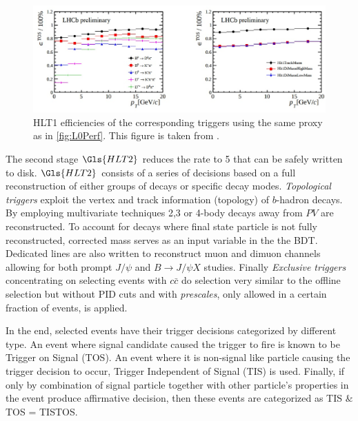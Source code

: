 \begin{figure}[!h]
	\centering
	\includegraphics[width = 1.0\textwidth]{figs/detector/HLT1performance.eps}%
	\caption{ \Gls{HLT1} efficiencies of the corresponding triggers using the same proxy as in \autoref{fig:L0Perf}.  This figure is taken from \cite{Albrecht:2013fba}. }  
	\label{fig:Hlt1Perf}
\end{figure}

The second stage $\Gls{HLT2}$ reduces the rate to 5 \khz that can be safely written to disk. $\Gls{HLT2}$ consists of a series of decisions based on a full reconstruction of either groups of decays or specific decay modes. \textit{Topological triggers} exploit the vertex and track information (topology) of $b$-hadron decays. By employing multivariate techniques 2,3 or 4-body decays away from $PV$ are reconstructed. To account for decays where final state particle is not fully reconstructed, corrected mass serves as an input variable in the the \Gls{BDT}. Dedicated lines are also written to reconstruct muon and dimuon channels allowing for both prompt $J/\psi$ and $B\rightarrow J/\psi X$ studies. Finally \textit{Exclusive triggers} concentrating on selecting events with $c\bar{c}$ do selection very similar to the offline selection but without \Gls{PID} cuts and with \textit{prescales}, only allowed in a certain fraction of events, is applied.


In the end, selected events have their trigger decisions categorized by different type.  An event where signal candidate caused the trigger to fire is known to be Trigger on Signal (\Gls{TOS}). An event where it is non-signal like particle causing the trigger decision to occur, Trigger Independent of Signal (\Gls{TIS}) is used. Finally, if only by combination of signal particle together with other particle's properties in the event produce affirmative decision, then these events are categorized as \Gls{TIS} $\&$ \Gls{TOS} = \Gls{TISTOS}.

